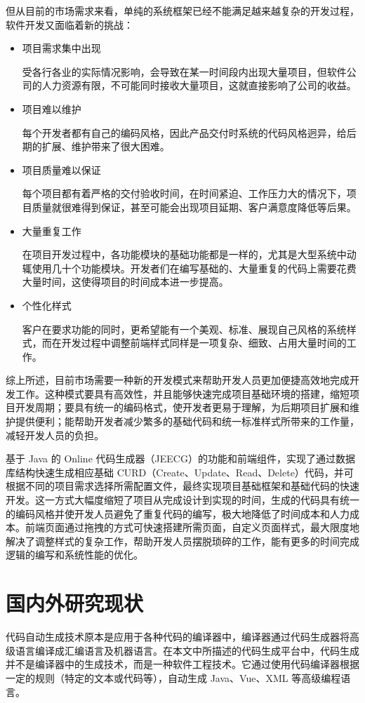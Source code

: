 \documentclass{izdthesis}
\begin{document}
但从目前的市场需求来看，单纯的系统框架已经不能满足越来越复杂的开发过程，软件开发又面临着新的挑战：
\begin{itemize}
  \item 项目需求集中出现\par
  受各行各业的实际情况影响，会导致在某一时间段内出现大量项目，但软件公司的人力资源有限，不可能同时接收大量项目，这就直接影响了公司的收益。
  \item 项目难以维护\par
  每个开发者都有自己的编码风格，因此产品交付时系统的代码风格迥异，给后期的扩展、维护带来了很大困难。
  \item 项目质量难以保证\par
  每个项目都有着严格的交付验收时间，在时间紧迫、工作压力大的情况下，项目质量就很难得到保证，甚至可能会出现项目延期、客户满意度降低等后果。
  \item 大量重复工作\par
  在项目开发过程中，各功能模块的基础功能都是一样的，尤其是大型系统中动辄使用几十个功能模块。开发者们在编写基础的、大量重复的代码上需要花费大量时间，这使得项目的时间成本进一步提高。
  \item 个性化样式\par
  客户在要求功能的同时，更希望能有一个美观、标准、展现自己风格的系统样式，而在开发过程中调整前端样式同样是一项复杂、细致、占用大量时间的工作。
\end{itemize}

综上所述，目前市场需要一种新的开发模式来帮助开发人员更加便捷高效地完成开发工作。这种模式要具有高效性，并且能够快速完成项目基础环境的搭建，缩短项目开发周期；要具有统一的编码格式，使开发者更易于理解，为后期项目扩展和维护提供便利；能帮助开发者减少繁多的基础代码和统一标准样式所带来的工作量，减轻开发人员的负担\cite{ref2}。

基于 Java 的 Online 代码生成器（JEECG）的功能和前端组件，实现了通过数据库结构快速生成相应基础 CURD（Create、Update、Read、Delete）代码，并可根据不同的项目需求选择所需配置文件，最终实现项目基础框架和基础代码的快速开发。这一方式大幅度缩短了项目从完成设计到实现的时间，生成的代码具有统一的编码风格并使开发人员避免了重复代码的编写，极大地降低了时间成本和人力成本。前端页面通过拖拽的方式可快速搭建所需页面，自定义页面样式，最大限度地解决了调整样式的复杂工作，帮助开发人员摆脱琐碎的工作，能有更多的时间完成逻辑的编写和系统性能的优化\cite{ref3}。

\section{国内外研究现状}
代码自动生成技术原本是应用于各种代码的编译器中，编译器通过代码生成器将高级语言编译成汇编语言及机器语言。在本文中所描述的代码生成平台中，代码生成并不是编译器中的生成技术，而是一种软件工程技术。它通过使用代码编译器根据一定的规则（特定的文本或代码等），自动生成 Java、Vue、XML 等高级编程语言。
\end{document}
